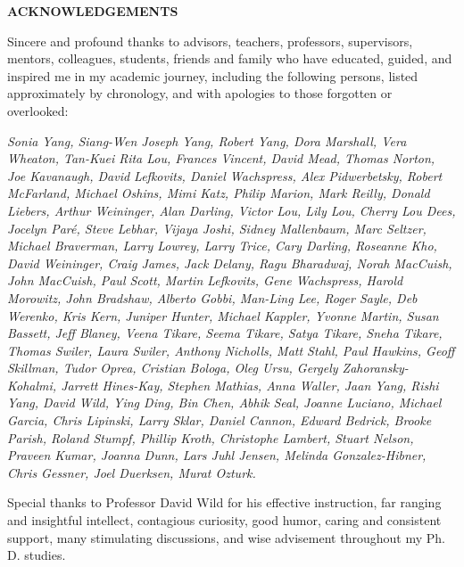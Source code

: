\begin{centering}
\textbf{ACKNOWLEDGEMENTS}\\
\vspace{\baselineskip}
\end{centering}

Sincere and profound thanks to advisors, teachers, professors, supervisors, mentors, colleagues, students, friends and family who have educated, guided, and inspired me in my academic journey, including the following persons, listed approximately by chronology, and with apologies to those forgotten or overlooked:

\begin{singlespace}
\textit{Sonia Yang, Siang-Wen Joseph Yang, Robert Yang, Dora Marshall, Vera Wheaton, Tan-Kuei Rita Lou, Frances Vincent, David Mead, Thomas Norton, Joe Kavanaugh, David Lefkovits, Daniel Wachspress, Alex Pidwerbetsky, Robert McFarland, Michael Oshins, Mimi Katz, Philip Marion, Mark Reilly, Donald Liebers, Arthur Weininger, Alan Darling, Victor Lou, Lily Lou, Cherry Lou Dees, Jocelyn Par\'e, Steve Lebhar, Vijaya Joshi, Sidney Mallenbaum, Marc Seltzer, Michael Braverman, Larry Lowrey, Larry Trice, Cary Darling, Roseanne Kho, David Weininger, Craig James, Jack Delany, Ragu Bharadwaj, Norah MacCuish, John MacCuish, Paul Scott, Martin Lefkovits, Gene Wachspress, Harold Morowitz, John Bradshaw, Alberto Gobbi, Man-Ling Lee, Roger Sayle, Deb Werenko, Kris Kern, Juniper Hunter, Michael Kappler, Yvonne Martin, Susan Bassett, Jeff Blaney, Veena Tikare, Seema Tikare, Satya Tikare, Sneha Tikare, Thomas Swiler, Laura Swiler, Anthony Nicholls, Matt Stahl, Paul Hawkins, Geoff Skillman, Tudor Oprea, Cristian Bologa, Oleg Ursu, Gergely Zahoransky-Kohalmi, Jarrett Hines-Kay, Stephen Mathias, Anna Waller, Jaan Yang, Rishi Yang, David Wild, Ying Ding, Bin Chen, Abhik Seal, Joanne Luciano, Michael Garcia, Chris Lipinski, Larry Sklar, Daniel Cannon, Edward Bedrick, Brooke Parish, Roland Stumpf, Phillip Kroth, Christophe Lambert, Stuart Nelson, Praveen Kumar, Joanna Dunn, Lars Juhl Jensen, Melinda Gonzalez-Hibner, Chris Gessner, Joel Duerksen, Murat Ozturk.}
\end{singlespace}

Special thanks to Professor David Wild for his effective instruction, far ranging and insightful intellect, contagious curiosity, good humor, caring and consistent support, many stimulating discussions, and wise advisement throughout my Ph. D. studies.